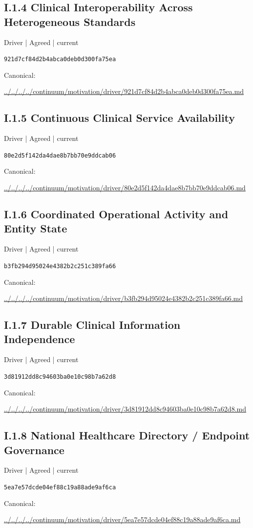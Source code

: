 \documentclass[10pt,a4paper]{article}
\begin{document}
\subsection*{I.1.4 Clinical Interoperability Across Heterogeneous Standards}
{\small Driver | Agreed | current}\par
\texttt{921d7cf84d2b4abca0deb0d300fa75ea}\par
Canonical: \par
{\footnotesize\url{../../../../continuum/motivation/driver/921d7cf84d2b4abca0deb0d300fa75ea.md}}\par
\subsection*{I.1.5 Continuous Clinical Service Availability}
{\small Driver | Agreed | current}\par
\texttt{80e2d5f142da4dae8b7bb70e9ddcab06}\par
Canonical: \par
{\footnotesize\url{../../../../continuum/motivation/driver/80e2d5f142da4dae8b7bb70e9ddcab06.md}}\par
\subsection*{I.1.6 Coordinated Operational Activity and Entity State}
{\small Driver | Agreed | current}\par
\texttt{b3fb294d95024e4382b2c251c389fa66}\par
Canonical: \par
{\footnotesize\url{../../../../continuum/motivation/driver/b3fb294d95024e4382b2c251c389fa66.md}}\par
\subsection*{I.1.7 Durable Clinical Information Independence}
{\small Driver | Agreed | current}\par
\texttt{3d81912dd8c94603ba0e10c98b7a62d8}\par
Canonical: \par
{\footnotesize\url{../../../../continuum/motivation/driver/3d81912dd8c94603ba0e10c98b7a62d8.md}}\par
\subsection*{I.1.8 National Healthcare Directory / Endpoint Governance}
{\small Driver | Agreed | current}\par
\texttt{5ea7e57dcde04ef88c19a88ade9af6ca}\par
Canonical: \par
{\footnotesize\url{../../../../continuum/motivation/driver/5ea7e57dcde04ef88c19a88ade9af6ca.md}}\par
\end{document}
